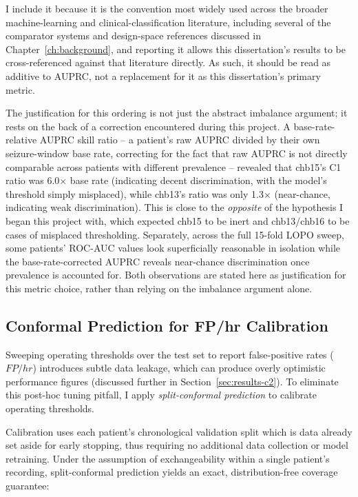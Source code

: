 I include it because it is the convention most widely used across the broader machine-learning 
and clinical-classification literature, including several of the comparator systems and design-space references discussed in Chapter~\ref{ch:background}, and reporting it allows this 
dissertation's results to be cross-referenced against that literature directly. As such, it should be read as additive to AUPRC, not a replacement for it as this dissertation's primary metric.

The justification for this ordering is not just the abstract imbalance argument; it rests on the back of a correction encountered during this project. A 
base-rate-relative AUPRC skill ratio -- a patient's raw AUPRC divided by their own seizure-window base rate, correcting for the fact that raw AUPRC is not directly comparable across 
patients with different prevalence -- revealed that chb15's C1 ratio was 6.0$\times$ base rate (indicating decent discrimination, with the model's threshold simply misplaced), while chb13's ratio was only 1.3$\times$ (near-chance, indicating weak discrimination). This is close to the \emph{opposite} of the hypothesis I began this project with, which expected chb15 to be inert and chb13/chb16 to be cases of misplaced thresholding. 
Separately, across the full 15-fold LOPO sweep, some patients' ROC-AUC values look superficially reasonable in isolation while the base-rate-corrected AUPRC reveals near-chance discrimination once prevalence is accounted for. Both observations are stated here as justification for this metric choice, rather than relying on the imbalance argument alone.

\subsection{Conformal Prediction for FP/hr Calibration}

Sweeping operating thresholds over the test set to report false-positive rates ($FP/hr$) introduces subtle data leakage, which can produce overly optimistic performance figures (discussed further in Section~\ref{sec:results-c2}). To eliminate this post-hoc tuning pitfall, I apply \emph{split-conformal prediction} to calibrate operating thresholds. 

Calibration uses each patient's chronological validation split which is data already set aside for early stopping, thus requiring no additional data collection or model retraining. Under the assumption of exchangeability within a single patient's recording, split-conformal prediction yields an exact, distribution-free coverage guarantee:

